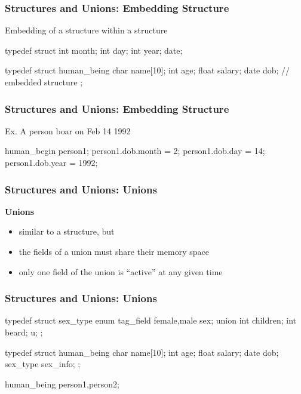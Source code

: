 \documentclass[newPxFont,sthlmFooter,nooffset]{beamer}
\begin{document}
\begin{frame}[t, fragile]
  \frametitle{Structures and Unions: Embedding Structure}
Embedding of a structure within a structure
\begin{codedef}
typedef struct { 
    int month; 
    int day;
    int year;
} date;

typedef struct human_being { 
    char name[10];
    int age;
    float salary;
    date dob; // embedded structure
};  
\end{codedef}
\end{frame}

\begin{frame}[t, fragile]
  \frametitle{Structures and Unions: Embedding Structure}
Ex. A person boar on Feb 14 1992
\begin{codedef}
human_begin person1;
person1.dob.month = 2;
person1.dob.day = 14;
person1.dob.year = 1992;
\end{codedef}
\end{frame}


\begin{frame}[t]
  \frametitle{Structures and Unions: Unions}
\textbf{Unions}
\begin{itemize}
\item similar to a structure, but
\item the fields of a union must share their memory space
\item only one field of the union is ``active'' at any given time
\end{itemize}
\end{frame}

\begin{frame}[t, fragile]
  \frametitle{Structures and Unions: Unions}
\begin{codedef}
typedef struct sex_type {
    enum tag_field {female,male} sex; 
    union {
        int children;
        int beard; } u;
};

typedef struct human_being {
    char name[10]; 
    int age;
    float salary; 
    date dob; 
    sex_type sex_info;
};

human_being person1,person2;    
\end{codedef}
\end{frame}
\end{document}
